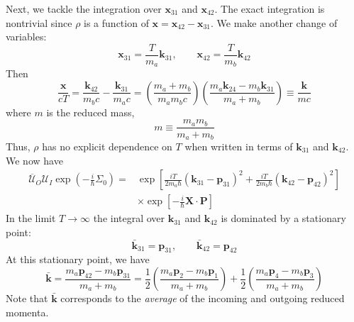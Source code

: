 Next, we tackle the integration over $\mathbf{x}_{31}$ and $\mathbf{x}_{42}$. The exact integration is nontrivial since $\rho$ is a function of $\mathbf{x} = \mathbf{x}_{42} - \mathbf{x}_{31}$. We make another change of variables:
\begin{equation}
	\mathbf{x}_{31} = \frac{T}{m_{a}} \mathbf{k}_{31}, \qquad \mathbf{x}_{42} = \frac{T}{m_{b}} \mathbf{k}_{42}
\end{equation}
Then
\begin{equation}
	\frac{\mathbf{x}}{c T} = \frac{\mathbf{k}_{42}}{m_{b}c} - \frac{\mathbf{k}_{31}}{m_{a}c} = \left( \frac{m_{a} + m_{b}}{m_{a} m_{b} c} \right) \left( \frac{m_{a} \mathbf{k}_{24} - m_{b} \mathbf{k}_{31}}{m_{a} + m_{b}} \right) \equiv \frac{\mathbf{k}}{m c}
\end{equation}
where $m$ is the reduced mass,
\begin{equation}
	m \equiv \frac{m_{a} m_{b}}{m_{a} + m_{b}}
\end{equation}
Thus, $\rho$ has no explicit dependence on $T$ when written in terms of $\mathbf{k}_{31}$ and $\mathbf{k}_{42}$. We now have
\begin{equation}
\begin{split}
	\overline{\mathcal{U}}_{O} \mathcal{U}_{I} \exp{\left(- \frac{i}{\hbar} \Sigma_{0} \right)} = {}& \exp{\left[ \frac{i T}{2 m_{a} \hbar} \left( \mathbf{k}_{31} - \mathbf{p}_{31} \right)^{2} + \frac{i T}{2 m_{b} \hbar} \left( \mathbf{k}_{42} - \mathbf{p}_{42} \right)^{2} \right]} \\
	&\times \exp{\left[- \frac{i}{\hbar} \mathbf{X} \cdot \mathbf{P} \right]}
\end{split}
\end{equation}
In the limit $T \rightarrow \infty$ the integral over $\mathbf{k}_{31}$ and $\mathbf{k}_{42}$ is dominated by a stationary point:
\begin{equation}
	\bar{\mathbf{k}}_{31} = \mathbf{p}_{31}, \qquad \bar{\mathbf{k}}_{42} =  \mathbf{p}_{42}
\end{equation}
At this stationary point, we have
\begin{equation}
	\bar{\mathbf{k}} = \frac{m_{a} \mathbf{p}_{42} - m_{b} \mathbf{p}_{31}}{m_{a} + m_{b}} = \frac{1}{2} \left( \frac{m_{a} \mathbf{p}_{2} - m_{b} \mathbf{p}_{1}}{m_{a} + m_{b}} \right) + \frac{1}{2} \left( \frac{m_{a} \mathbf{p}_{4} - m_{b} \mathbf{p}_{3}}{m_{a} + m_{b}} \right)
\end{equation}
Note that $\bar{\mathbf{k}}$ corresponds to the \textit{average} of the incoming and outgoing reduced momenta.

